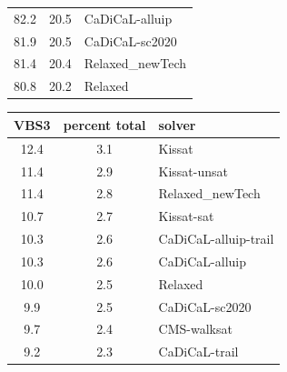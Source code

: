 \documentclass{elsarticle}
\begin{document}
\begin{table}
\begin{center}
\begin{tabular}{ccl}
\phantom{0}82.2 & 20.5 & CaDiCaL-alluip \\
\phantom{0}81.9 & 20.5 & CaDiCaL-sc2020 \\
\phantom{0}81.4 & 20.4 & Relaxed\_newTech \\
\phantom{0}80.8 & 20.2 & Relaxed \\
\end{tabular}
\end{center}
\begin{center}
\begin{tabular}{ccl}
VBS3 & percent total & solver \\
\hline
12.4 & 3.1 & Kissat \\
11.4 & 2.9 & Kissat-unsat \\
11.4 & 2.8 & Relaxed\_newTech \\
10.7 & 2.7 & Kissat-sat \\
10.3 & 2.6 & CaDiCaL-alluip-trail \\
10.3 & 2.6 & CaDiCaL-alluip \\
10.0 & 2.5 & Relaxed \\
\phantom{0}9.9 & 2.5 & CaDiCaL-sc2020 \\
\phantom{0}9.7 & 2.4 & CMS-walksat \\
\phantom{0}9.2 & 2.3 & CaDiCaL-trail \\
\end{tabular}
\end{center}
\end{table}
\end{document}
